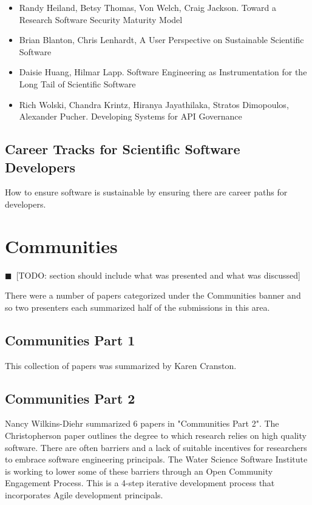 \documentclass[11pt, oneside]{amsart}
\newcommand{\todo}[1]{{\color{blue}$\blacksquare$~\textsf{[TODO: #1]}}}
\begin{document}
\begin{itemize}

\item Randy Heiland, Betsy Thomas, Von Welch, Craig Jackson. Toward a Research Software Security Maturity Model \cite{Heiland_WSSSPE}

\item Brian Blanton, Chris Lenhardt, A User Perspective on Sustainable Scientific Software \cite{Blanton_WSSSPE}

\item Daisie Huang, Hilmar Lapp. Software Engineering as Instrumentation for the Long Tail of Scientific Software \cite{Huang_WSSSPE}

\item Rich Wolski, Chandra Krintz, Hiranya Jayathilaka, Stratos Dimopoulos, Alexander Pucher. Developing Systems for API Governance \cite{Wolski_WSSSPE}
 
\end{itemize}


\subsection{Career Tracks for Scientific Software Developers}

How to ensure software is sustainable by ensuring there are career paths for developers.

\section{Communities}

\todo{section should include what was presented and what was discussed}

There were a number of papers categorized under the Communities banner and so two presenters each summarized half of the submissions in this area.

\subsection{Communities Part 1}

This collection of papers was summarized by Karen Cranston.

\subsection{Communities Part 2}

Nancy Wilkins-Diehr summarized 6 papers in "Communities Part 2". The Christopherson paper outlines the degree to which research
relies on high quality software. There are often barriers and a lack of suitable incentives for researchers to embrace software engineering principals.
The Water Science Software Institute is working to lower some of these barriers through an Open Community Engagement Process.
This is a 4-step iterative development process that incorporates Agile development principals.
\end{document}
